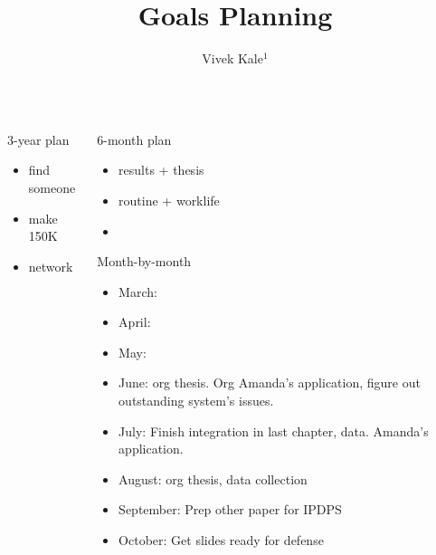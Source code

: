 \documentclass[serif, mathserif, final]{beamer}
\title{Goals Planning}
\author{Vivek Kale$^1$}
\institute{$^1$ University of Illinois at Urbana-Champaign \quad}
\begin{document}
\begin{frame}{}

  \begin{columns}
    \begin{column}{0.33\linewidth} 
      \begin{block}{ 3-year plan }
        \begin{itemize} 
        \item \small find someone 
        \item \small make 150K 
        \item \small network
        \end{itemize} 
      \end{block} 
    \end{column}%
    

\begin{column}{0.27\linewidth} 

\begin{block}{ 6-month plan  } 
\begin{itemize} 
\small \item \small results + thesis
\item \small routine + worklife 
\item \small 
\end{itemize} 
\end{block} 

\begin{block}{ Month-by-month}
\begin{itemize}
\item \small March: 
\item \small April:
\item \small May: 
\item \small June: org thesis. Org Amanda's application, figure out outstanding system's issues. 
\item \small July: Finish integration in last chapter, data. Amanda's application. 
\item \small August: org thesis, data collection
\item \small September: Prep other paper for IPDPS
\item \small October: Get slides ready for defense 
\end{itemize}
\end{block}
\end{column} %


\end{columns}
\end{frame}
\end{document}
